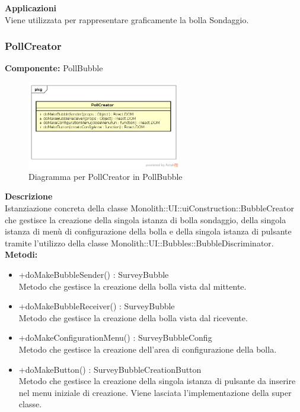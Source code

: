 \textbf{Applicazioni}\\
Viene utilizzata per rappresentare graficamente la bolla Sondaggio. 


\clearpage

\subsubsection{PollCreator}
\textbf{Componente:}  PollBubble\\
   \FloatBarrier
   \begin{figure}[ht]
   \centering
   \includegraphics[width=0.6\textwidth]{img/single-PollCreator.png}
   \caption{{Diagramma per PollCreator in PollBubble}}
\end{figure}
\FloatBarrier
\textbf{Descrizione}\\
Istanziazione concreta della classe Monolith::UI::uiConstruction::BubbleCreator che gestisce la creazione della singola istanza di bolla sondaggio, della singola istanza di menù di configurazione della bolla e della singola istanza di pulsante tramite l'utilizzo della classe Monolith::UI::Bubbles::BubbleDiscriminator.
\\
\textbf{Metodi:} 
\begin{itemize}
\item +doMakeBubbleSender() : SurveyBubble 
\\
Metodo che gestisce la creazione della bolla vista dal mittente.
\item +doMakeBubbleReceiver() : SurveyBubble 
\\
Metodo che gestisce la creazione della bolla vista dal ricevente.
\item +doMakeConfigurationMenu() : SurveyBubbleConfig 
\\
Metodo che gestisce la creazione dell'area di configurazione della bolla.
\item +doMakeButton() : SurveyBubbleCreationButton 
\\
Metodo che gestisce la creazione della singola istanza di pulsante da inserire nel menu iniziale di creazione. Viene lasciata l'implementazione della super classe.
\end{itemize} 


